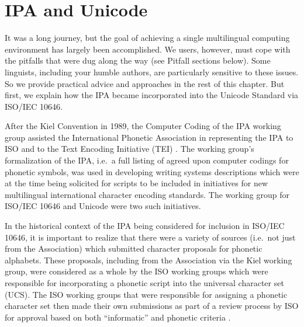 \section{IPA and Unicode}

It was a long journey, but the goal of achieving a single multilingual 
computing environment has largely been accomplished. We users, however, 
must cope with the pitfalls that were dug along the way (see Pitfall sections below). 
Some linguists, including your humble authors, are particularly sensitive 
to these issues. So we provide practical advice and approaches in the rest 
of this chapter. But first, we explain how the IPA became incorporated 
into the Unicode Standard via ISO/IEC 10646.


After the Kiel Convention in 1989, the Computer Coding of the IPA working 
group assisted the International Phonetic Association in representing the 
IPA to ISO and to the Text Encoding Initiative (TEI) \citep{EslingGaylord1993}. 
The working group's formalization of the IPA, i.e.\ a full listing of agreed 
upon computer codings for phonetic symbols, was used in developing writing 
systems descriptions which were at the time being solicited for scripts to 
be included in initiatives for new multilingual international character 
encoding standards. The working group for ISO/IEC 10646 and Unicode were 
two such initiatives.

In the historical context of the IPA being considered for inclusion in 
ISO/IEC 10646, it is important to realize that there were a variety of 
sources (i.e.\ not just from the Association) which submitted character 
proposals for phonetic alphabets. These proposals, including from the 
Association via the Kiel working group, were considered as a whole by 
the ISO working groups which were responsible for incorporating a phonetic 
script into the universal character set (UCS). The ISO working groups that 
were responsible for assigning a phonetic character set then made their 
own submissions as part of a review process by ISO for approval based on 
both ``informatic'' and phonetic criteria \citep[86]{EslingGaylord1993}. 

